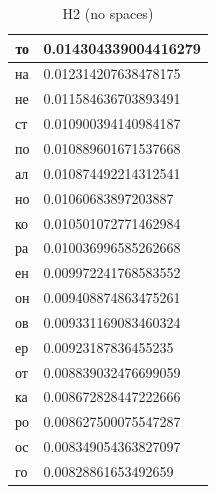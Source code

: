 \begin{table}[]
\centering
\caption{H2 (no spaces)}
\label{tab:my-table}
\begin{tabular}{ll}
\hline
\multicolumn{1}{|c|}{\textbf{то}} & \multicolumn{1}{c|}{\textbf{0.014304339004416279}} \\ \hline
\multicolumn{1}{|l|}{на}          & \multicolumn{1}{l|}{0.012314207638478175}          \\ \hline
\multicolumn{1}{|l|}{не}          & \multicolumn{1}{l|}{0.011584636703893491}          \\ \hline
\multicolumn{1}{|l|}{ст}          & \multicolumn{1}{l|}{0.010900394140984187}          \\ \hline
\multicolumn{1}{|l|}{по}          & \multicolumn{1}{l|}{0.010889601671537668}          \\ \hline
\multicolumn{1}{|l|}{ал}          & \multicolumn{1}{l|}{0.010874492214312541}          \\ \hline
\multicolumn{1}{|l|}{но}          & \multicolumn{1}{l|}{0.01060683897203887}           \\ \hline
\multicolumn{1}{|l|}{ко}          & \multicolumn{1}{l|}{0.010501072771462984}          \\ \hline
\multicolumn{1}{|l|}{ра}          & \multicolumn{1}{l|}{0.010036996585262668}          \\ \hline
\multicolumn{1}{|l|}{ен}          & \multicolumn{1}{l|}{0.009972241768583552}          \\ \hline
\multicolumn{1}{|l|}{он}          & \multicolumn{1}{l|}{0.009408874863475261}          \\ \hline
\multicolumn{1}{|l|}{ов}          & \multicolumn{1}{l|}{0.009331169083460324}          \\ \hline
\multicolumn{1}{|l|}{ер}          & \multicolumn{1}{l|}{0.00923187836455235}           \\ \hline
\multicolumn{1}{|l|}{от}          & \multicolumn{1}{l|}{0.008839032476699059}          \\ \hline
\multicolumn{1}{|l|}{ка}          & \multicolumn{1}{l|}{0.008672828447222666}          \\ \hline
\multicolumn{1}{|l|}{ро}          & \multicolumn{1}{l|}{0.008627500075547287}          \\ \hline
\multicolumn{1}{|l|}{ос}          & \multicolumn{1}{l|}{0.008349054363827097}          \\ \hline
\multicolumn{1}{|l|}{го}          & \multicolumn{1}{l|}{0.00828861653492659}           \\ \hline

\end{tabular}
\end{table}
